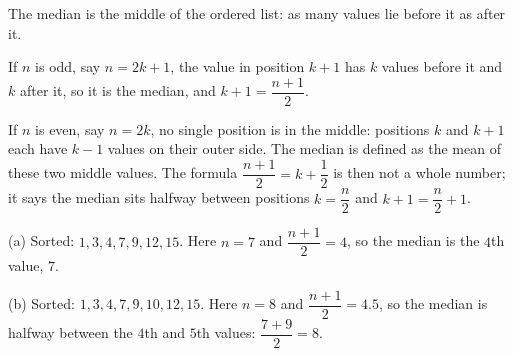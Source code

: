 The median is the middle of the ordered list: as many values lie before it as after it.

If $n$ is odd, say $n=2k+1$, the value in position $k+1$ has $k$ values before it and $k$ after it, so it is the median, and $k+1=\dfrac{n+1}{2}$.

If $n$ is even, say $n=2k$, no single position is in the middle: positions $k$ and $k+1$ each have $k-1$ values on their outer side. The median is defined as the mean of these two middle values. The formula $\dfrac{n+1}{2}=k+\dfrac{1}{2}$ is then not a whole number; it says the median sits halfway between positions $k=\dfrac {n}{2}$ and $k+1=\dfrac {n}{2}+1$.

(a) Sorted: $1,3,4,7,9,12,15$. Here $n=7$ and $\dfrac{n+1}{2}=4$, so the median is the $4$th value, $\boxed{7}$.

(b) Sorted: $1,3,4,7,9,10,12,15$. Here $n=8$ and $\dfrac{n+1}{2}=4.5$, so the median is halfway between the $4$th and $5$th values: $\dfrac{7+9}{2}=\boxed{8}$.
